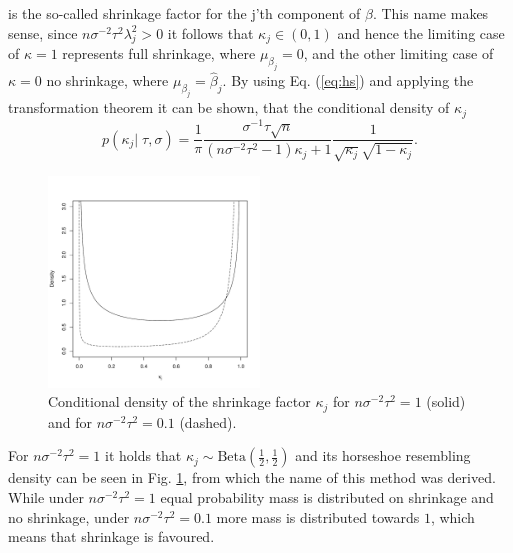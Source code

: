 \documentclass[12pt,letterpaper]{article}
\numberwithin{equation}{subsection}
\begin{document}
is the so-called shrinkage factor for the j'th component of $\beta$. This name makes sense, since $n\sigma^{-2}\tau^2\lambda^2_j > 0$ it follows that $\kappa_j \in (0,1)$ and hence the limiting case of $\kappa = 1$ represents full shrinkage, where $\mu_{\beta_j} = 0$, and the other limiting case of $\kappa = 0$ no shrinkage, where $\mu_{\beta_j} = \hat{\beta}_j$.
By using Eq. (\ref{eq:hs}) and applying the transformation theorem it can be shown, that the conditional density of $\kappa_j$
\begin{equation}
p(\kappa_j|\;\tau,\sigma) = \frac{1}{\pi}\frac{\sigma^{-1}\tau\sqrt{n}}{(n\sigma^{-2}\tau^2 - 1)\kappa_j + 1}\frac{1}{\sqrt{\kappa_j}\sqrt{1-\kappa_j}}. 
\label{eq:kappa}
\end{equation}
\begin{figure}[bt!]
 \centering
 \includegraphics[width=0.5\textwidth]{../plots/kappa.pdf}
 \caption{Conditional density of the shrinkage factor $\kappa_j$ for $n\sigma^{-2}\tau^2 = 1$ (solid) and 
 for $n\sigma^{-2}\tau^2 = 0.1$ (dashed).}
 \label{fig:hs}
\end{figure}
For $n\sigma^{-2}\tau^2 = 1$ it holds that $\kappa_j \sim \text{Beta}(\frac{1}{2},\frac{1}{2})$ and its horseshoe resembling density can be seen in Fig. \ref{fig:hs}, from which the name of this method was derived. While under $n\sigma^{-2}\tau^2 = 1$ equal probability mass is distributed on shrinkage and no shrinkage, under  $n\sigma^{-2}\tau^2 = 0.1$ more mass is distributed towards $1$, which means that shrinkage is favoured.
\end{document}
